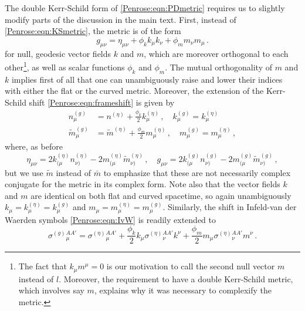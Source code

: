 The double Kerr-Schild form of \eqref{Penrose:eqn:PDmetric} requires us to slightly modify parts of the discussion in the main text. First, instead of \eqref{Penrose:eqn:KSmetric}, the metric is of the form
\begin{equation}\label{Penrose:eqn:metricKSdouble}
g_{\mu \nu} = \eta_{\mu \nu} + \phi_k k_{\mu} k_{\nu} + \phi_m m_{\nu} m_{\mu} \, .
\end{equation}
for null, geodesic vector fields $k$ and $m$, which are moreover orthogonal to each other\footnote{The fact that
$k_{\mu}m^{\mu} = 0$ is our motivation to call the second null vector $m$ instead of $l$. Moreover, the requirement
to have a double Kerr-Schild metric, which involves say $m$, explains why it was necessary to complexify the
metric.}, as well as scalar functions $\phi_k$ and $\phi_m$. The mutual orthogonality of $m$ and $k$ implies first of all that one can unambiguously raise and lower their indices with either the flat or the curved metric. Moreover, the extension of the Kerr-Schild shift \eqref{Penrose:eqn:frameshift} is given by
\begin{equation}\label{Penrose:eqn:KSshiftdouble}
\begin{aligned}
n^{(g)}_{\mu} &= n^{(\eta)} + \frac{\phi_k}{2} k^{(\eta)}_{\mu} \, , \quad  k^{(g)}_{\mu} = k^{(\eta)}_{\mu} \\
\tilde{m}^{(g)}_{\mu} &= \tilde{m}^{(\eta)} + \frac{\phi_m}{2} m^{(\eta)}_{\mu} \, , \quad  m^{(g)}_{\mu} = m^{(\eta)}_{\mu} \, ,
\end{aligned}
\end{equation}
where, as before
\begin{equation}
\eta_{\mu \nu} = 2 k^{(\eta)}_{(\mu} n^{(\eta)}_{\nu)} -  2 m^{(\eta)}_{(\mu} \tilde{m}^{(\eta)}_{\nu)} \, , \quad 	g_{\mu \nu} = 2 k^{(g)}_{(\mu} n^{(g)}_{\nu)} -  2 m^{(g)}_{(\mu} \tilde{m}^{(g)}_{\nu)} \, ,
\end{equation}
but we use $\tilde{m}$ instead of $\bar{m}$ to emphasize that these are not necessarily complex conjugate for the metric in its complex form. Note also that the vector fields $k$ and $m$ are identical on both flat and curved spacetime, so again unambiguously $k_{\mu} = k_{\mu}^{(\eta)} = k_{\mu}^{(g)}$ and $m_{\mu} = m_{\mu}^{(\eta)} = m_{\mu}^{(g)}$. Similarly, the shift in Infeld-van der Waerden symbols \eqref{Penrose:eqn:IvW} is readily extended to 
\begin{equation}\label{Penrose:eqn:IvWdouble}
\sigma^{(g)}{}{}^{AA'}_{\mu}   = \sigma^{(\eta)}{}{}^{AA'}_{\mu} + \frac{\phi_k}{2} k_{\mu} \sigma^{(\eta)}{}{}^{AA'}_{\nu} k^{\nu} + \frac{\phi_m}{2} m_{\mu} \sigma^{(\eta)}{}{}^{AA'}_{\nu} m^{\nu} \, .
\end{equation}

